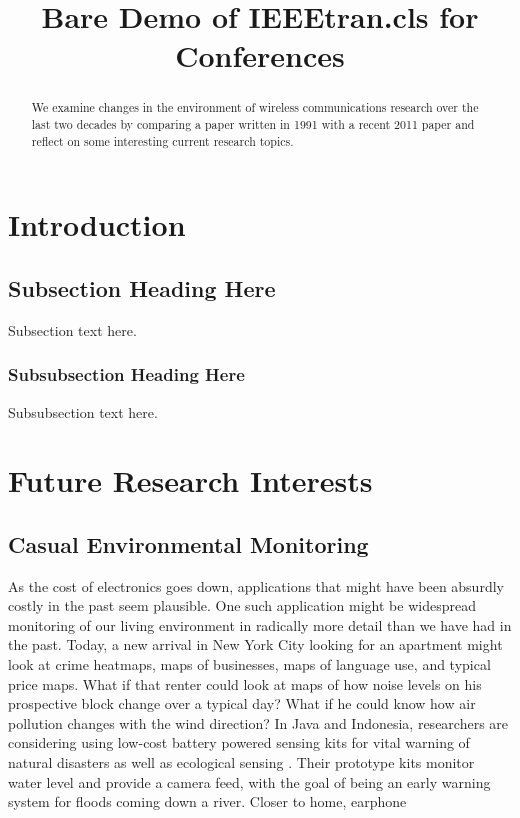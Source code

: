 \documentclass[conference]{IEEEtran}
\begin{document}
%
\title{Bare Demo of IEEEtran.cls for Conferences}


\author{
}

\maketitle


\begin{abstract}
We examine changes in the environment of wireless communications
research over the last two decades by comparing a paper written in 1991 \cite{oldpaper:rapp}
with a recent 2011 paper \cite{newpaper:rapp} and reflect on some interesting current research topics.
\end{abstract}
\IEEEpeerreviewmaketitle

\section{Introduction}


\subsection{Subsection Heading Here}
Subsection text here.


\subsubsection{Subsubsection Heading Here}
Subsubsection text here.

\section{Future Research Interests}
\subsection{Casual Environmental Monitoring}
As the cost of electronics goes down, applications that might have been
absurdly costly in the past seem plausible.  One such application might be
widespread monitoring of our living environment in radically more detail
than we have had in the past.  Today, a new arrival in New York City 
looking for an apartment might look at crime heatmaps, maps of businesses,
maps of language use, and typical price maps.  What if that renter could 
look at maps of how noise levels on his prospective block change over a typical
day?  What if he could know how air pollution changes with the wind direction?
In Java and Indonesia, researchers are considering using low-cost battery powered
sensing kits for vital warning of natural disasters as well as ecological
sensing \cite{envmon:wira}.  Their prototype kits monitor water level and provide
a camera feed, with the goal of being an early warning system for floods coming
down a river.  Closer to home, earphone
\end{document}
